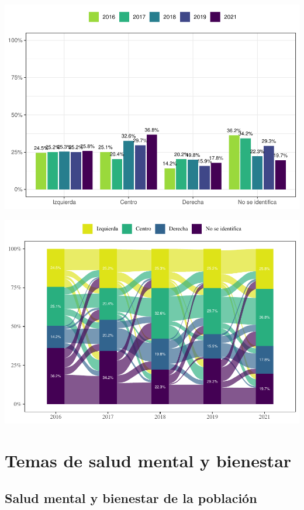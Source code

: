 \documentclass[
  12pt,
]{book}
\begin{document}
\begin{center}\includegraphics{reporte-elsoc_files/figure-latex/unnamed-chunk-16-1} \end{center}

\begin{center}\includegraphics{reporte-elsoc_files/figure-latex/unnamed-chunk-17-1} \end{center}

\hypertarget{temas-de-salud-mental-y-bienestar}{%
\chapter{Temas de salud mental y bienestar}\label{temas-de-salud-mental-y-bienestar}}

\hypertarget{salud-mental-y-bienestar-de-la-poblaciuxf3n}{%
\section{Salud mental y bienestar de la población}\label{salud-mental-y-bienestar-de-la-poblaciuxf3n}}
\end{document}
